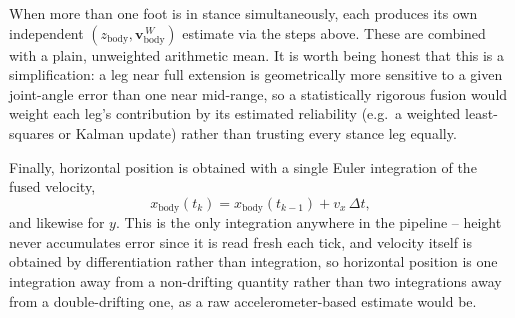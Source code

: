 \documentclass[11pt]{article}
\begin{document}
When more than one foot is in stance simultaneously, each produces its own
independent $(z_{\text{body}}, \mathbf{v}_{\text{body}}^{\,W})$ estimate via the
steps above. These are combined with a plain, unweighted arithmetic mean.
It is worth being honest that this is a simplification: a leg near full
extension is geometrically more sensitive to a given joint-angle error than
one near mid-range, so a statistically rigorous fusion would weight each
leg's contribution by its estimated reliability (e.g.\ a weighted
least-squares or Kalman update) rather than trusting every stance leg
equally.

Finally, horizontal position is obtained with a single Euler integration of
the fused velocity,
\begin{equation}
x_{\text{body}}(t_k) = x_{\text{body}}(t_{k-1}) + v_{x}\,\Delta t,
\end{equation}
and likewise for $y$. This is the only integration anywhere in the
pipeline -- height never accumulates error since it is read fresh each
tick, and velocity itself is obtained by differentiation rather than
integration, so horizontal position is one integration away from a
non-drifting quantity rather than two integrations away from a
double-drifting one, as a raw accelerometer-based estimate would be.
\end{document}
